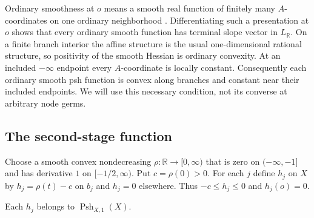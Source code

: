 Ordinary smoothness at $o$ means a smooth real function of finitely many $A$-coordinates on one ordinary neighborhood \cite[Definition~6.2.1]{CLD25}. Differentiating such a presentation at $o$ shows that every ordinary smooth function has terminal slope vector in $L_{\mathbb R}$. On a finite branch interior the affine structure is the usual one-dimensional rational structure, so positivity of the smooth Hessian is ordinary convexity. At an included $-\infty$ endpoint every $A$-coordinate is locally constant. Consequently each ordinary smooth psh function is convex along branches and constant near their included endpoints. We will use this necessary condition, not its converse at arbitrary node germs.

\subsection{The second-stage function}\label{sec:supplied-p071b-construction}

Choose a smooth convex nondecreasing $\rho:\mathbb R\to[0,\infty)$ that is zero on $(-\infty,-1]$ and has derivative $1$ on $[-1/2,\infty)$. Put $c=\rho(0)>0$. For each $j$ define $h_j$ on $X$ by $h_j=\rho(t)-c$ on $b_j$ and $h_j=0$ elsewhere. Thus $-c\leq h_j\leq0$ and $h_j(o)=0$.

\begin{lemma}\label{lem:supplied-p071b-first-stage-blocks}
Each $h_j$ belongs to $\operatorname{Psh}_{X,1}(X)$.
\end{lemma}

